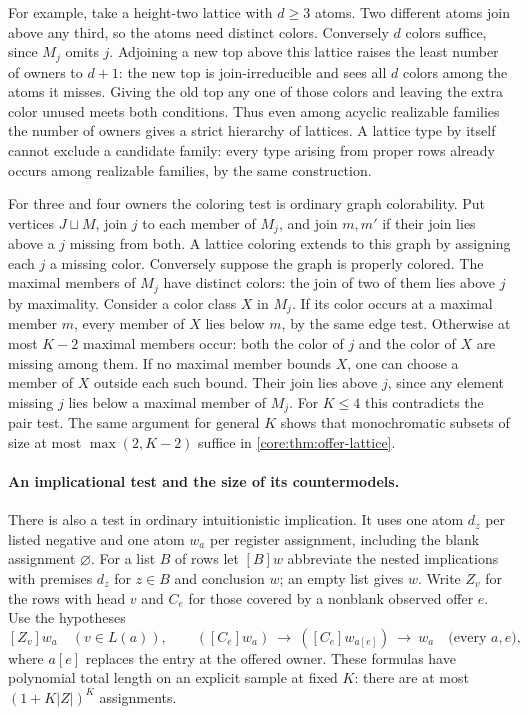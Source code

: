 For example, take a height-two lattice with $d\ge3$ atoms. Two
different atoms join above any third, so the atoms need distinct
colors. Conversely $d$ colors suffice, since $M_j$ omits $j$.
Adjoining a new top above this lattice raises the least number of
owners to $d+1$: the new top is join-irreducible and sees all $d$
colors among the atoms it misses. Giving the old top any one of
those colors and leaving the extra color unused meets both conditions.
Thus even among acyclic realizable families the number of owners
gives a strict hierarchy of lattices. A lattice type by itself cannot
exclude a candidate family: every type arising from proper rows
already occurs among realizable families, by the same construction.

For three and four owners the coloring test is ordinary graph
colorability. Put vertices $J\sqcup M$, join $j$ to each member of
$M_j$, and join $m,m'$ if their join lies above a $j$ missing from
both. A lattice coloring extends to this graph by assigning each
$j$ a missing color. Conversely suppose the graph is properly colored.
The maximal members of $M_j$ have distinct colors: the join of two of
them lies above $j$ by maximality. Consider a color class $X$ in
$M_j$. If its color occurs at a maximal member $m$, every member of
$X$ lies below $m$, by the same edge test. Otherwise at most $K-2$
maximal members occur: both the color of $j$ and the color of $X$
are missing among them. If no maximal member bounds $X$, one can
choose a member of $X$ outside each such bound. Their join lies above
$j$, since any element missing $j$ lies below a maximal member of
$M_j$. For $K\le4$ this contradicts the pair test. The same argument
for general $K$ shows that monochromatic subsets of size at most
$\max(2,K-2)$ suffice in \cref{core:thm:offer-lattice}.

\paragraph{An implicational test and the size of its countermodels.}
There is also a test in ordinary intuitionistic implication. It uses
one atom $d_z$ per listed negative and one atom $w_a$ per register
assignment, including the blank assignment $\varnothing$. For a list
$B$ of rows let $[B]w$ abbreviate the nested implications with
premises $d_z$ for $z\in B$ and conclusion $w$; an empty list gives
$w$. Write $Z_v$ for the rows with head $v$ and $C_e$ for those
covered by a nonblank observed offer $e$. Use the hypotheses
\[
 [Z_v]w_a \quad(v\in L(a)),\qquad
 ([C_e]w_a)\ \to\ ([C_e]w_{a[e]})\ \to\ w_a
       \quad\text{(every $a,e$)},
\]
where $a[e]$ replaces the entry at the offered owner.
These formulas have polynomial total length on an explicit sample at
fixed $K$: there are at most $(1+K|Z|)^K$ assignments.


